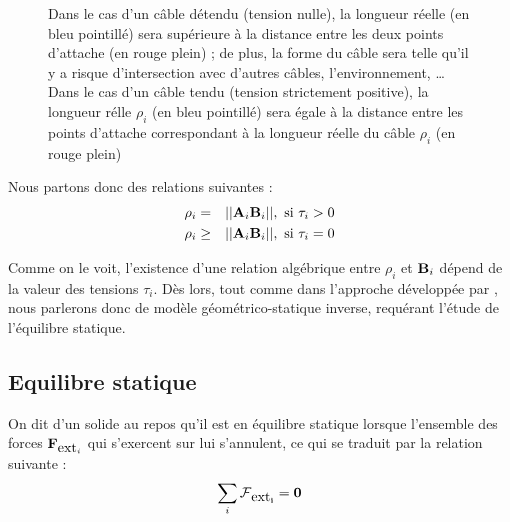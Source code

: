 \begin{figure}[!ht]
  \centering
\hfill
{}
    \caption{\footnotesize{Dans le cas d'un câble détendu (tension nulle), la 
longueur r\'eelle (en bleu pointill\'e) sera supérieure à la distance entre les 
deux points d'attache (en rouge plein) ; de plus, la forme du câble sera telle 
qu'il y a risque d'intersection avec d'autres câbles, l'environnement, \dots 
Dans le cas d'un câble tendu (tension strictement positive), la 
longueur r\'elle $\rho_i$ (en bleu pointill\'e) sera \'egale à la 
distance entre les points d'attache correspondant à la longueur réelle du 
câble $\rho_i$ (en rouge plein)}}
\label{intro:fig6}
\end{figure}

Nous partons donc des relations suivantes :
\begin{eqnarray}
\rho_i &=& ||{\bf A}_i {\bf B}_i||, \hbox{ si } \tau_i > 0 \\ 
\rho_i &\geq& ||{\bf A}_i {\bf B}_i||, \hbox{ si } \tau_i = 0
\label{intro:eq1}
\end{eqnarray}

Comme on le voit, l'existence d'une relation alg\'ebrique entre $\rho_i$ et 
${\bf B}_i$ d\'epend de la valeur des tensions $\tau_i$. Dès lors, tout comme 
dans l'approche développée par \cite{2010:Carricato.Merlet}, nous parlerons donc 
de modèle géométrico-statique inverse, requérant l'étude de l'équilibre 
statique.

\subsection{Equilibre statique} \label{chap0-2-2}

On dit d'un solide au repos qu'il est en équilibre statique lorsque l'ensemble 
des forces $\mathcal {\bf F}_{\hbox{ext}_i}$ qui s'exercent sur lui 
s'annulent, ce qui se traduit par la relation suivante :
\begin{equation}
\sum_i \bf{\hbox{$\mathcal F$}}_{\hbox{ext}_i} = {\bf 0}
\label{intro:eq2}
\end{equation}


